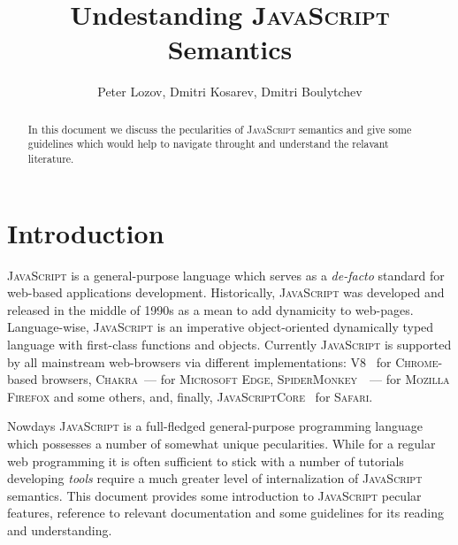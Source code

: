 \documentclass{article}
\date{}
\newcommand{\js}{\textsc{JavaScript}\xspace}
\begin{document}
\title{Undestanding \js Semantics}

\author{Peter Lozov, Dmitri Kosarev, Dmitri Boulytchev}

\maketitle

\begin{abstract}
  In this document we discuss the pecularities of \js semantics and give some
  guidelines which would help to navigate throught and understand the relavant
  literature.
\end{abstract}

\section{Introduction}

\js is a general-purpose language which serves as a \emph{de-facto} standard for web-based
applications development. Historically, \js was developed and released in the middle of 1990s
as a mean to add dynamicity to web-pages. Language-wise, \js is an imperative object-oriented
dynamically typed language with first-class functions and objects. Currently \js is
supported by all mainstream web-browsers via different implementations: \textsc{V8}~\cite{V8}
for \textsc{Chrome}-based browsers, \textsc{Chakra}~--- for \textsc{Microsoft Edge},
\textsc{SpiderMonkey}~\cite{SpiderMonkey}~--- for \textsc{Mozilla Firefox} and some others, and,
finally, \textsc{JavaScriptCore}~\cite{JavaScriptCore} for \textsc{Safari}.

Nowdays \js is a full-fledged general-purpose programming language which possesses a number of
somewhat unique pecularities. While for a regular web programming it is often sufficient to
stick with a number of tutorials~\cite{Tutorial} developing \emph{tools} require a
much greater level of internalization of \js semantics. This document provides some
introduction to \js pecular features, reference to relevant documentation and
some guidelines for its reading and understanding.
\end{document}

